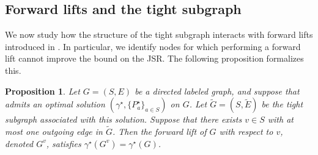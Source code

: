 \documentclass[letterpaper, 10 pt, conference]{ieeeconf}  %
\newtheorem{proposition}{Proposition}
\newif\ifextended
\begin{document}
\subsection{Forward lifts and the tight subgraph}
We now study how the structure of the tight subgraph interacts with forward lifts introduced in . In particular, we identify nodes for which performing a forward lift cannot improve the bound on the JSR. The following proposition formalizes this.
\begin{proposition}
Let $G=(S,E)$ be a directed labeled graph, and suppose that  admits an optimal solution $(\gamma^\star ,\{P_a^\star \}_{a\in S})$ on $G$. Let $\tilde G=(S,\tilde E)$ be the tight
subgraph associated with this solution. Suppose that there exists
$v\in S$ with at most one outgoing edge in $\tilde G$. Then the forward lift of $G$ with
respect to $v$, denoted $G^v$, satisfies $\gamma^\star(G^v)=\gamma^\star(G)$.\label{prop:at_most_1_tight}
\end{proposition}
\ifextended
\begin{proof}
Let $v\in S$ with at most one outgoing edge in $\tilde E$. We already know that $\gamma^\star (G^v)\le\gamma^\star (G)$ by
\Cref{thm:relaxation_forward}. Let
$(\gamma,\{\hat P_a\}_{a\in S^v})$ be feasible for
\Cref{prob:graph_opt} on $G^v$. We construct
$(\gamma,\{P_a\}_{a\in S})$ feasible for $\tilde G=(S,\tilde E)$.

If $\{(v,b,i)\in\tilde E\}=\{(v,\bar b,\bar i)\}$, set
\[
P_a\coloneqq\hat P_a \ (a\neq v),\qquad
P_v\coloneqq\hat P_{v^{(\bar b)}} .
\]
If $\{(v,b,i)\in\tilde E\}=\emptyset$, choose
$\bar b\in\mathrm{Post}(v)$ and set $P_v\coloneqq\hat P_{v^{(\bar b)}}$.

We verify feasibility for each $(a,b,i)\in\tilde E$.

If $a,b\neq v$, the edge appears identically in $G^v$, hence
\[
\gamma^2 P_a\succeq A_i^\top P_b A_i .
\]

If $a=v$ and $b\neq v$, then necessarily $b=\bar b$, and $G^v$
contains the edge $(v^{(\bar b)},\bar b,i)$, so
\[
\gamma^2 P_v=\gamma^2 \hat P_{v^{(\bar b)}}\succeq A_i^\top \hat P_{\bar b} A_i=A_i^\top P_{\bar b} A_i.
\]

If $a=b=v$, then $\bar b=v$ and $G^v$ contains
$(v^{(v)},v^{(v)},i)$, and feasibility of $G^v$ gives
\[
\gamma^2 \hat P_{v^{(v)}}\succeq A_i^\top \hat P_{v^{(v)}} A_i ,
\]
which yields $\gamma^2 P_v\succeq A_i^\top P_v A_i$.

If $a\neq v$ and $b=v$, then $(a,v^{(w)},i)\in E^v$ for any
$w\in\mathrm{Post}(v)$, hence
\[
\gamma^2 \hat P_a\succeq A_i^\top \hat P_{v^{(w)}} A_i .
\]
Taking $w=\bar b$ gives $\gamma^2 P_a\succeq A_i^\top P_v A_i$.

Thus $(\gamma,\{P_a\})$ is feasible for $\tilde G$. Therefore every feasible solution for $G^v$ yields a feasible solution for $\tilde G$ with the same objective value, implying $\gamma^\star (G^v)\ge\gamma^\star (\tilde G)$. Since
$\gamma^\star (G)=\gamma^\star (\tilde G)$ by \Cref{prop:opt_tight},
we obtain $\gamma^\star (G^v)\ge\gamma^\star (G)$, concluding the proof.
\end{proof}
\fi
\end{document}
